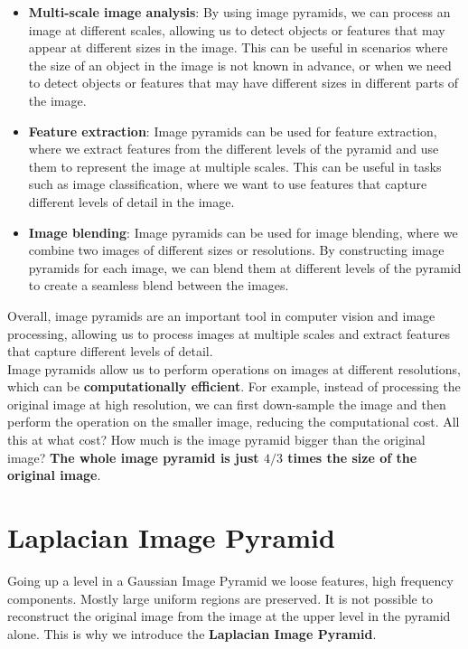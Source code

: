 \documentclass{article}
\begin{document}
\begin{itemize}
    \item \textbf{Multi-scale image analysis}: By using image pyramids, we can process an image at different scales, allowing us to detect objects or features that may appear at different sizes in the image. This can be useful in scenarios where the size of an object in the image is not known in advance, or when we need to detect objects or features that may have different sizes in different parts of the image.
    \item \textbf{Feature extraction}: Image pyramids can be used for feature extraction, where we extract features from the different levels of the pyramid and use them to represent the image at multiple scales. This can be useful in tasks such as image classification, where we want to use features that capture different levels of detail in the image.
    \item \textbf{Image blending}: Image pyramids can be used for image blending, where we combine two images of different sizes or resolutions. By constructing image pyramids for each image, we can blend them at different levels of the pyramid to create a seamless blend between the images.
\end{itemize}

Overall, image pyramids are an important tool in computer vision and image processing, allowing us to process images at multiple scales and extract features that capture different levels of detail. \\

Image pyramids allow us to perform operations on images at different resolutions, which can be \textbf{computationally efficient}. For example, instead of processing the original image at high resolution, we can first down-sample the image and then perform the operation on the smaller image, reducing the computational cost. All this at what cost? How much is the image pyramid bigger than the original image? \textbf{The whole image pyramid is just $4/3$ times the size of the original image}. 

\newpage

\section*{Laplacian Image Pyramid}

Going up a level in a Gaussian Image Pyramid we loose features, high frequency components. Mostly large uniform regions are preserved. It is not possible to reconstruct the original image from the image at the upper level in the pyramid alone. This is why we introduce the \textbf{Laplacian Image Pyramid}. \\
\end{document}
